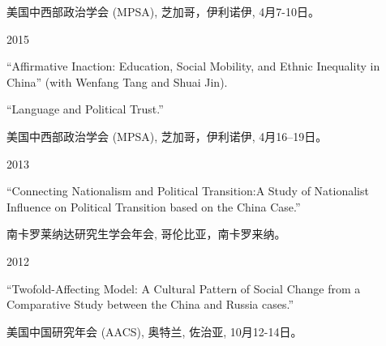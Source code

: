 \documentclass[10.5pt,]{article}
\providecommand{\tightlist}{%
	\setlength{\itemsep}{0pt}\setlength{\parskip}{0pt}}
\renewenvironment{itemize}{
	\begin{list}{}{
			\setlength{\leftmargin}{1.5em}
		}
	}{
	\end{list}
}
\begin{document}
\begin{itemize}
\begin{itemize}
    \begin{itemize}
    \tightlist
    \item
      \footnotesize 美国中西部政治学会 (MPSA), 芝加哥，伊利诺伊,
      4月7-10日。
    \end{itemize}
  \end{itemize}
\item
  2015

  \begin{itemize}
  \tightlist
  \item
    ``Affirmative Inaction: Education, Social Mobility, and Ethnic
    Inequality in China'' (with Wenfang Tang and Shuai Jin).
  \item
    ``Language and Political Trust.''

    \begin{itemize}
    \tightlist
    \item
      \footnotesize 美国中西部政治学会 (MPSA), 芝加哥，伊利诺伊,
      4月16--19日。
    \end{itemize}
  \end{itemize}
\item
  2013

  \begin{itemize}
  \tightlist
  \item
    ``Connecting Nationalism and Political Transition:A Study of
    Nationalist Influence on Political Transition based on the China
    Case.''

    \begin{itemize}
    \tightlist
    \item
      \footnotesize 南卡罗莱纳达研究生学会年会, 哥伦比亚，南卡罗来纳。
    \end{itemize}
  \end{itemize}
\item
  2012

  \begin{itemize}
  \tightlist
  \item
    ``Twofold-Affecting Model: A Cultural Pattern of Social Change from
    a Comparative Study between the China and Russia cases.''

    \begin{itemize}
    \tightlist
    \item
      \footnotesize 美国中国研究年会 (AACS), 奥特兰, 佐治亚,
      10月12-14日。
    \end{itemize}
  \end{itemize}
\end{itemize}
\end{document}
